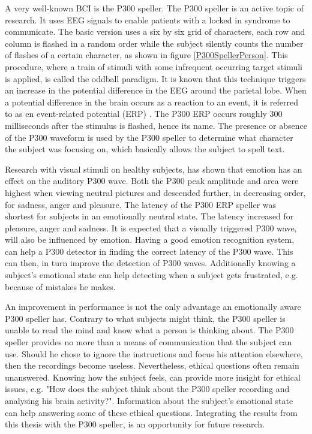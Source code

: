 
A very well-known BCI is the P300 speller. The P300 speller is an active topic of research. It uses EEG signals to enable patients with a locked in syndrome to communicate\cite{P300Origin}. The basic version uses a six by six grid of characters, each row and column is flashed in a random order while the subject silently counts the number of flashes of a certain character, as shown in figure \ref{P300SpellerPerson}. This procedure, where a train of stimuli with some infrequent occurring target stimuli is applied, is called the oddball paradigm\cite{PaperThibault}. It is known that this technique triggers an increase in the potential difference in the EEG around the parietal lobe. When a potential difference in the brain occurs as a reaction to an event, it is referred to as en event-related potential (ERP) . The P300 ERP occurs roughly 300 milliseconds after the stimulus is flashed, hence its name\citep{ComparisonClassifications}. The presence or absence of the P300 waveform is used by the P300 speller to determine what character the subject was focusing on, which basically allows the subject to spell text. 


Research with visual stimuli on healthy subjects, has shown that emotion has an effect on the auditory P300 wave\cite{AuditoryP300Effect}. Both the P300 peak amplitude and area were highest when viewing neutral pictures and descended further, in decreasing order, for sadness, anger and pleasure. The latency of the P300 ERP speller was shortest for subjects in an emotionally neutral state. The latency increased for pleasure, anger and sadness. It is expected that a visually triggered P300 wave, will also be influenced by emotion. Having a good emotion recognition system, can help a P300 detector in finding the correct latency of the P300 wave. This can then, in turn improve the detection of P300 waves. Additionally knowing a subject's emotional state can help detecting when a subject gets frustrated, e.g. because of mistakes he makes.

\npar

An improvement in performance is not the only advantage an emotionally aware P300 speller has. Contrary to what subjects might think, the P300 speller is unable to read the mind and know what a person is thinking about\cite{P300Origin}. The P300 speller provides no more than a means of communication that the subject can use. Should he chose to ignore the instructions and focus his attention elsewhere, then the recordings become useless. Nevertheless, ethical questions often remain unanswered. Knowing how the subject feels, can provide more insight for ethical issues, e.g. "How does the subject think about the P300 speller recording and analysing his brain activity?". Information about the subject's emotional state can help answering some of these ethical questions. Integrating the results from this thesis with the P300 speller, is an opportunity for future research.

